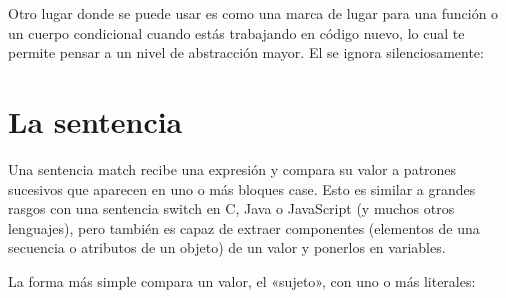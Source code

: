 \documentclass[a4,10pt,spanish]{sphinxmanual}
\begin{document}
\sphinxAtStartPar
Otro lugar donde se puede usar  es como una marca de lugar para una función o un cuerpo condicional cuando estás trabajando en código nuevo, lo cual te permite pensar a un nivel de abstracción mayor. El  se ignora silenciosamente:

\begin{sphinxVerbatim}[commandchars=\\\{\}]
 
       
\end{sphinxVerbatim}


\section{La sentencia }
\label{\detokenize{tutorial/controlflow:match-statements}}\label{\detokenize{tutorial/controlflow:tut-match}}
\sphinxAtStartPar
Una sentencia match recibe una expresión y compara su valor a patrones sucesivos que aparecen en uno o más bloques case. Esto es similar a grandes rasgos con una sentencia switch en C, Java o JavaScript (y muchos otros lenguajes), pero también es capaz de extraer componentes (elementos de una secuencia o atributos de un objeto) de un valor y ponerlos en variables.

\sphinxAtStartPar
La forma más simple compara un valor, el «sujeto», con uno o más literales:

\begin{sphinxVerbatim}[commandchars=\\\{\}]
 
     
         
             
         
             
         
             
         
             
\end{sphinxVerbatim}
\end{document}
